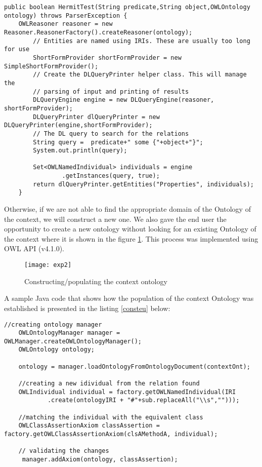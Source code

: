 \begin{lstlisting}[captionpos=b, caption=Relations search using Hermit reasoner and a DL Query, label={hermitt},
basicstyle=\footnotesize,frame=single]
    public boolean HermitTest(String predicate,String object,OWLOntology ontology) throws ParserException {
    OWLReasoner reasoner = new Reasoner.ReasonerFactory().createReasoner(ontology);
        // Entities are named using IRIs. These are usually too long for use
        ShortFormProvider shortFormProvider = new SimpleShortFormProvider();
        // Create the DLQueryPrinter helper class. This will manage the
        // parsing of input and printing of results
        DLQueryEngine engine = new DLQueryEngine(reasoner, shortFormProvider);
        DLQueryPrinter dlQueryPrinter = new DLQueryPrinter(engine,shortFormProvider);
        // The DL query to search for the relations
        String query =  predicate+" some {"+object+"}";
        System.out.println(query);

        Set<OWLNamedIndividual> individuals = engine
                .getInstances(query, true);
        return dlQueryPrinter.getEntities("Properties", individuals);
    } 
\end{lstlisting}



Otherwise, if we are not able to find the appropriate domain of the Ontology of the context, we will construct a new one. We also gave the end user the opportunity to create a new ontology without looking for an existing Ontology of the context where it is shown in the figure \ref{fig_const}. This process was implemented using OWL API (v4.1.0).  

\begin{figure}[H]
\centering
\texttt{[image: exp2]}
\caption{Constructing/populating the context ontology }
\label{fig_const}
\end{figure}
\bigskip

A sample Java code that shows how the population of the context Ontology was established is presented in the listing \ref{consteu} below: \\

\begin{lstlisting}[captionpos=b, caption=Context ontology population definition in Java, label={consteu},
basicstyle=\footnotesize,frame=single]
    //creating ontology manager
    OWLOntologyManager manager = OWLManager.createOWLOntologyManager(); 
    OWLOntology ontology;
            
    ontology = manager.loadOntologyFromOntologyDocument(contextOnt);

    //creating a new idividual from the relation found
    OWLIndividual individual = factory.getOWLNamedIndividual(IRI
            .create(ontologyIRI + "#"+sub.replaceAll("\\s","")));
            
    //matching the individual with the equivalent class    
    OWLClassAssertionAxiom classAssertion = factory.getOWLClassAssertionAxiom(clsAMethodA, individual);

    // validating the changes         
     manager.addAxiom(ontology, classAssertion);       
\end{lstlisting}


